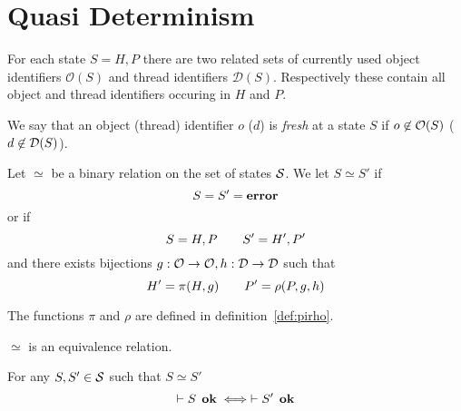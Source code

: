 \chapter{Quasi Determinism}
\label{cha:determinism}


\begin{definition}
  For each state $S = H, P$ there are two related sets of currently used object
  identifiers $\mathcal{O}(S)$ and thread identifiers $\mathcal{D}(S)$.
  Respectively these contain all object and thread identifiers occuring in $H$
  and $P$. 
\end{definition}

\begin{definition}
  We say that an object (thread) identifier $o$ ($d$) is \emph{fresh} at a state $S$ if
  $o \not\in \mathcal{O}(S)$ ($d \not\in \mathcal{D}(S)$).
\end{definition}

\begin{definition} \label{def:eqrel}
  Let $\simeq$ be a binary relation on the set of states $\mathcal{S}$.
  We let $S \simeq S'$ if
  \begin{equation*}
    S = S' = \mbox{{\bf error}}
  \end{equation*}
  or if
  \begin{equation}
    S = H, P \quad\quad S' = H', P'
  \end{equation}
  and there exists bijections $g: \mathcal{O} \to \mathcal{O}, h: \mathcal{D} \to \mathcal{D}$
  such that
  \begin{equation}
    H' = \pi(H, g) \quad\quad P' = \rho(P, g, h)
  \end{equation}
  
  The functions $\pi$ and $\rho$ are defined in definition~\ref{def:pirho}.
\end{definition}



\begin{proposition} \label{prop:eqrel}
  $\simeq$ is an equivalence relation.
\end{proposition}

\begin{proposition} \label{prop:eqrel_stateok}
  For any $S, S' \in \mathcal{S}$ such that $S \simeq S'$
  \begin{equation}
    \vdash S \:\: \mbox{\bf ok} \iff \vdash S' \:\: \mbox{\bf ok}
  \end{equation}
\end{proposition}


